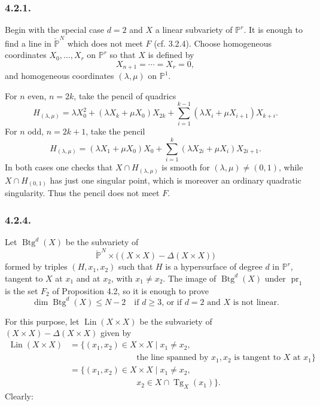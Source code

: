 \subsubsection*{4.2.1.}
Begin with the special case $d=2$ and $X$ a linear subvariety of
$\mathbb P^r$.  It is enough to find a line in
$\check{\mathbb P}^{N}$ which does not meet $F$ (cf. 3.2.4).  Choose
homogeneous coordinates $X_0,\ldots,X_r$ on $\mathbb P^r$ so that
$X$ is defined by
\[
X_{n+1}=\cdots=X_r=0,
\]
and homogeneous coordinates $(\lambda,\mu)$ on $\mathbb P^1$.

For $n$ even, $n=2k$, take the pencil of quadrics
\begin{equation}\tag{4.2.2}
H_{(\lambda,\mu)}
=\lambda X_0^2+(\lambda X_k+\mu X_0)X_{2k}
 +\sum_{i=1}^{k-1}(\lambda X_i+\mu X_{i+1})X_{k+i}.
\end{equation}
For $n$ odd, $n=2k+1$, take the pencil
\begin{equation}\tag{4.2.3}
H_{(\lambda,\mu)}
=(\lambda X_1+\mu X_0)X_0
 +\sum_{i=1}^{k}(\lambda X_{2i}+\mu X_i)X_{2i+1}.
\end{equation}
In both cases one checks that $X\cap H_{(\lambda,\mu)}$ is smooth for
$(\lambda,\mu)\ne(0,1)$, while $X\cap H_{(0,1)}$ has just one
singular point, which is moreover an ordinary quadratic singularity.
Thus the pencil does not meet $F$.

\subsubsection*{4.2.4.}
Let $\operatorname{Btg}^{d}(X)$ be the subvariety of
\[
\check{\mathbb P}^{N}\times
\bigl((X\times X)-\Delta(X\times X)\bigr)
\]
formed by triples $(H,x_1,x_2)$ such that $H$ is a hypersurface of
degree $d$ in $\mathbb P^r$, tangent to $X$ at $x_1$ and at $x_2$,
with $x_1\ne x_2$.  The image of $\operatorname{Btg}^{d}(X)$ under
$\operatorname{pr}_1$ is the set $F_2$ of Proposition 4.2, so it is
enough to prove
\begin{equation}\tag{4.2.5}
\dim\operatorname{Btg}^{d}(X)\leq N-2
\quad\text{if $d\geq3$, or if $d=2$ and $X$ is not linear.}
\end{equation}

For this purpose, let $\operatorname{Lin}(X\times X)$ be the
subvariety of $(X\times X)-\Delta(X\times X)$ given by
\begin{equation}\tag{4.2.6}
\begin{aligned}
\operatorname{Lin}(X\times X)
&=\bigl\{(x_1,x_2)\in X\times X\mid x_1\ne x_2,\\[-1ex]
&\hspace{8em}\text{the line spanned by $x_1,x_2$ is tangent to $X$ at $x_1$}
\bigr\}\\
&=\bigl\{(x_1,x_2)\in X\times X\mid x_1\ne x_2,\\[-1ex]
&\hspace{8em}x_2\in X\cap\operatorname{Tg}_X(x_1)\bigr\}.
\end{aligned}
\end{equation}
Clearly:


